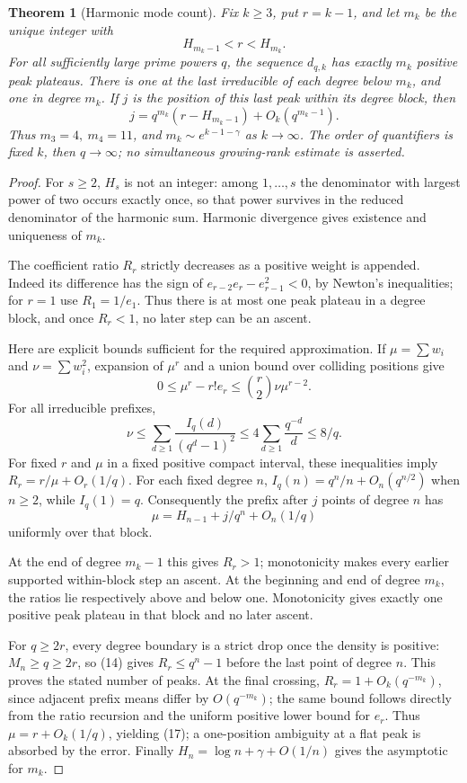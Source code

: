 \documentclass[11pt]{article}
\newtheorem{theorem}{Theorem}[section]
\begin{document}
\begin{theorem}[Harmonic mode count]\label{thm:modeCount}
Fix \(k\geq3\), put \(r=k-1\), and let \(m_k\) be the unique integer with
\[
                       H_{m_k-1}<r<H_{m_k}.
\]
For all sufficiently large prime powers \(q\), the sequence
\(d_{q,k}\) has exactly \(m_k\) positive peak plateaus.
There is one at the last irreducible of each degree below \(m_k\),
and one in degree \(m_k\). If \(j\) is the position of this last peak
within its degree block, then
\[
 j=q^{m_k}(r-H_{m_k-1})+O_k(q^{m_k-1}).             \tag{17}
\]
Thus \(m_3=4,\ m_4=11\), and \(m_k\sim e^{k-1-\gamma}\) as \(k\to\infty\).
The order of quantifiers is fixed \(k\), then \(q\to\infty\);
no simultaneous growing-rank estimate is asserted.
\end{theorem}
\begin{proof}
For \(s\geq2\), \(H_s\) is not an integer: among \(1,\ldots,s\)
the denominator with largest power of two occurs exactly once,
so that power survives in the reduced denominator of the harmonic sum.
Harmonic divergence gives existence and uniqueness of \(m_k\).

The coefficient ratio \(R_r\) strictly decreases as a positive weight
is appended. Indeed its difference has the sign of
\(e_{r-2}e_r-e_{r-1}^2<0\), by Newton's inequalities; for \(r=1\)
use \(R_1=1/e_1\). Thus there is at most one peak plateau in a degree
block, and once \(R_r<1\), no later step can be an ascent.

Here are explicit bounds sufficient for the required approximation.
If \(\mu=\sum w_i\) and \(\nu=\sum w_i^2\), expansion of \(\mu^r\)
and a union bound over colliding positions give
\[
 0\leq\mu^r-r!e_r\leq\binom r2\nu\mu^{r-2}.
\]
For all irreducible prefixes,
\[
 \nu\leq\sum_{d\geq1}\frac{I_q(d)}{(q^d-1)^2}
       \leq4\sum_{d\geq1}\frac{q^{-d}}d\leq8/q.
\]
For fixed \(r\) and \(\mu\) in a fixed positive compact interval,
these inequalities imply \(R_r=r/\mu+O_r(1/q)\).
For each fixed degree \(n\),
\(I_q(n)=q^n/n+O_n(q^{n/2})\) when \(n\geq2\), while \(I_q(1)=q\).
Consequently the prefix after \(j\) points of degree \(n\) has
\[
 \mu=H_{n-1}+j/q^n+O_n(1/q)
\]
uniformly over that block.

At the end of degree \(m_k-1\) this gives \(R_r>1\);
monotonicity makes every earlier supported within-block step an
ascent. At the beginning and end of degree \(m_k\), the ratios
lie respectively above and below one. Monotonicity gives exactly
one positive peak plateau in that block and no later ascent.

For \(q\geq2r\), every degree boundary is a strict drop once the
density is positive: \(M_n\geq q\geq2r\), so (14) gives
\(R_r\leq q^n-1\) before the last point of degree \(n\).
This proves the stated number of peaks. At the final crossing,
\(R_r=1+O_k(q^{-m_k})\), since adjacent prefix means differ by
\(O(q^{-m_k})\); the same bound follows directly from the ratio
recursion and the uniform positive lower bound for \(e_r\).
Thus \(\mu=r+O_k(1/q)\), yielding (17); a one-position ambiguity
at a flat peak is absorbed by the error. Finally
\(H_n=\log n+\gamma+O(1/n)\) gives the asymptotic for \(m_k\).
\end{proof}
\end{document}

